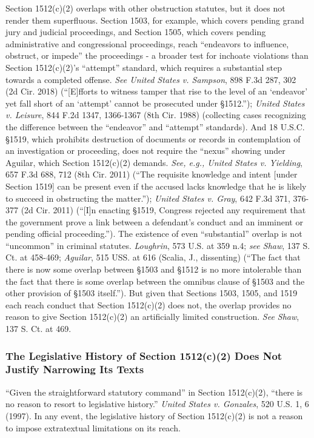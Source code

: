 Section 1512(c)(2) overlaps with other obstruction statutes, but it does not render them superfluous.
Section 1503, for example, which covers pending grand jury and judicial proceedings, and Section 1505, which covers pending administrative and congressional proceedings, reach “endeavors to influence, obstruct, or impede” the proceedings - a broader test for inchoate violations than Section 1512(c)(2)’s “attempt” standard, which requires a substantial step towards a completed offense.
\textit{See United States v. Sampson}, 898 F.3d 287, 302 (2d Cir. 2018) (“[E]fforts to witness tamper that rise to the level of an ‘endeavor’ yet fall short of an ‘attempt’ cannot be prosecuted under \S 1512.”);
\textit{United States v. Leisure}, 844 F.2d 1347, 1366-1367 (8th Cir. 1988) (collecting cases recognizing the difference between the “endeavor” and “attempt” standards).
And 18 U.S.C. \S 1519, which prohibits destruction of documents or records in contemplation of an investigation or proceeding, does not require the “nexus” showing under Aguilar, which Section 1512(c)(2) demands.
\textit{See, e.g., United States v. Yielding}, 657 F.3d 688, 712 (8th Cir. 2011) (“The requisite knowledge and intent [under Section 1519] can be present even if the accused lacks knowledge that he is likely to succeed in obstructing the matter.”);
\textit{United States v. Gray}, 642 F.3d 371, 376-377 (2d Cir. 2011) (“[I]n enacting \S 1519, Congress rejected any requirement that the government prove a link between a defendant’s conduct and an imminent or pending official proceeding.”).
The existence of even “substantial” overlap is not “uncommon” in criminal statutes.
\textit{Loughrin}, 573 U.S. at 359 n.4;
\textit{see Shaw}, 137 S. Ct. at 458-469;
\textit{Aguilar}, 515 USS. at 616 (Scalia, J., dissenting) (“The fact that there is now some overlap between \S 1503 and \S 1512 is no more intolerable than the fact that there is some overlap between the omnibus clause of \S 1503 and the other provision of \S 1503 itself.”).
But given that Sections 1503, 1505, and 1519 each reach conduct that Section 1512(c)(2) does not, the overlap provides no reason to give Section 1512(c)(2) an artificially limited construction.
\textit{See Shaw}, 137 S. Ct. at 469.%

\subsubsection{The Legislative History of Section 1512(c)(2) Does Not Justify Narrowing Its Texts}

“Given the straightforward statutory command” in Section 1512(c)(2), “there is no reason to resort to legislative history.”
\textit{United States v. Gonzales}, 520 U.S. 1, 6 (1997).
In any event, the legislative history of Section 1512(c)(2) is not a reason to impose extratextual limitations on its reach.


